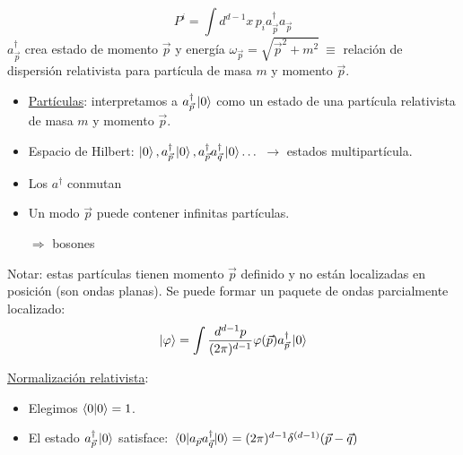 $$ P^i = \int d^{d-1}x \, p_i a_{\vec{p}}^\dagger a_{\vec{p}} $$
$a_{\vec{p}}^\dagger$ crea estado de momento $\vec{p}$ y energía $\omega_{\vec{p}} = \sqrt{\vec{p}^2 + m^2}\ \equiv$ relación de dispersión relativista para partícula de masa $m$ y momento $\vec{p}$.

\begin{itemize}
    \item \underline{Partículas}: interpretamos a $a_{\vec{p}}^\dagger \ket{0}$ como un estado de una partícula relativista de masa $m$ y momento $\vec{p}$.
    \item Espacio de Hilbert: $\ket{0}, a_{\vec{p}}^\dagger \ket{0}, a_{\vec{p}}^\dagger a_{\vec{q}}^\dagger \ket{0} \dots$ $\rightarrow$ estados multipartícula.
    \item[—] Los $a^\dagger$ conmutan
    \item[—] Un modo $\vec p$ puede contener infinitas partículas.

        $\Rightarrow$ bosones
\end{itemize}

{\centering
{}
\par}

\vspace{0.5cm}
\noindent Notar: estas partículas tienen momento $\vec{p}$ definido y no están localizadas en posición (son ondas planas). Se puede formar un paquete de ondas parcialmente localizado:
$$ \ket{\varphi} = \int \frac{d^{d-1}p}{(2\pi)^{d-1}} \varphi(\vec{p}) a_{\vec{p}}^\dagger \ket{0} $$

\vspace{0.5cm}
\noindent \underline{Normalización relativista}:
\begin{itemize}
    \item[—] Elegimos $\braket{0}{0} = 1$.
    \item[—] El estado $a_{\vec{p}}^\dagger \ket{0}$ satisface: $\matrixel{0}{a_{\vec{p}} a_{\vec{q}}^\dagger}{0} = (2\pi)^{d-1} \delta^{(d-1)}(\vec{p} - \vec{q})$
\end{itemize}

